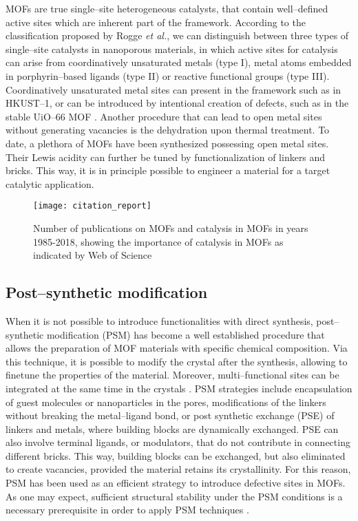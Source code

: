 MOFs are true single--site heterogeneous catalysts, that contain well--defined active sites which are inherent part of the framework\cite{yang2019catalysis}. According to the classification proposed by Rogge \textit{et al.}, we can distinguish between three types of single--site catalysts in nanoporous materials, in which active sites for catalysis can arise from coordinatively unsaturated metals (type I), metal atoms embedded in porphyrin--based ligands (type II) or reactive functional groups (type III). Coordinatively unsaturated metal sites can present in the framework such as in HKUST--1\cite{chui1999chemically}, or can be introduced by intentional creation of defects, such as in the stable UiO--66 MOF \cite{vandichel2015active}. Another procedure that can lead to open metal sites without generating vacancies is the dehydration upon thermal treatment. To date, a plethora of MOFs have been synthesized possessing open metal sites. Their Lewis acidity can further be tuned by functionalization of linkers and bricks. This way, it is in principle possible to engineer a material for a target catalytic application.

\begin{figure}[!htbp]
	\centering
 	\texttt{[image: citation\_report]}
	\caption{Number of publications on MOFs and catalysis in MOFs in years 1985-2018, showing the importance of catalysis in MOFs as indicated by Web of Science}
	\label{fig:citation_report}
\end{figure}
%
\subsection*{Post--synthetic modification}
When it is not possible to introduce functionalities with direct synthesis, post--synthetic modification (PSM) \cite{wang2009postsynthetic, cohen2011postsynthetic} has become a well established procedure that allows the preparation of MOF materials with specific chemical composition. Via this technique, it is possible to modify the crystal after the synthesis, allowing to finetune the properties of the material. Moreover, multi--functional sites can be integrated at the same time in the crystals \cite{li2016applications}. PSM strategies include encapsulation of guest molecules or nanoparticles in the pores, modifications of the linkers without breaking the metal--ligand bond, or post synthetic exchange (PSE) of linkers and metals, where building blocks are dynamically exchanged. PSE can also involve terminal ligands, or modulators, that do not contribute in connecting different bricks. This way, building blocks can be exchanged, but also eliminated to create vacancies, provided the material retains its crystallinity. For this reason, PSM has been used as an efficient strategy to introduce defective sites in MOFs. As one may expect, sufficient structural stability under the PSM conditions is a necessary prerequisite in order to apply PSM techniques \cite{garibay2010isoreticular}.
%
